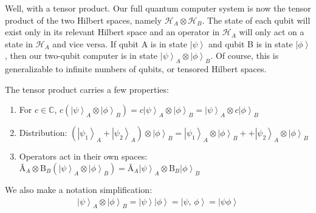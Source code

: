 \documentclass[11pt]{article} %
\newcommand{\ket}[1]{\left|#1\right\rangle}
\begin{document}
Well, with a tensor product. Our full quantum computer system is now the tensor product of the two Hilbert spaces, namely $\mathcal{H}_A \otimes \mathcal{H}_B$. The state of each qubit will exist only in its relevant Hilbert space and an operator in $\mathcal{H}_A$ will only act on a state in $\mathcal{H}_A$ and vice versa. If qubit A is in state $\ket{\psi}$ and qubit B is in state $\ket{\phi}$, then our two-qubit computer is in state $\ket{\psi}_A \otimes \ket{\phi}_B$. Of course, this is generalizable to infinite numbers of qubits, or tensored Hilbert spaces.

The tensor product carries a few properties:

\begin{enumerate}
    \item For $c \in \mathbb{C}$, $c\left(\ket{\psi}_A \otimes \ket{\phi}_B\right) = c\ket{\psi}_A \otimes \ket{\phi}_B = \ket{\psi}_A \otimes c\ket{\phi}_B$
    \item Distribution: $\left(\ket{\psi_1}_A + \ket{\psi_2}_A\right)\otimes \ket{\phi}_B = \ket{\psi_1}_A \otimes \ket{\phi}_B + + \ket{\psi_2}_A \otimes \ket{\phi}_B$
    \item Operators act in their own spaces: $\textrm{\^A}_A \otimes \textrm{\^B}_B\left(\ket{\psi}_A \otimes \ket{\phi}_B\right) = \textrm{\^A}_A\ket{\psi}_A \otimes \textrm{\^B}_B\ket{\phi}_B$
\end{enumerate}

\noindent We also make a notation simplification:
\begin{align}
    \ket{\psi}_A \otimes \ket{\phi}_B = \ket{\psi}\ket{\phi} = \ket{\psi,\,\phi} = \ket{\psi\phi} \nonumber
\end{align}
\end{document}
